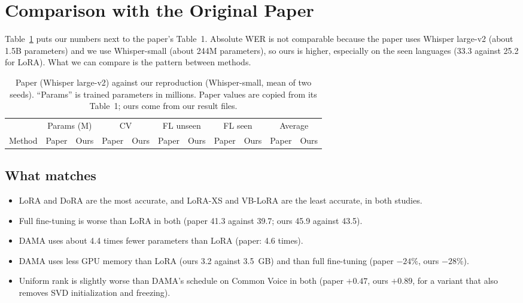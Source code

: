 \documentclass[11pt,a4paper]{article}
\begin{document}
\section{Comparison with the Original Paper}
Table~\ref{tab:paper} puts our numbers next to the paper's Table~1. Absolute WER is not comparable because the paper uses Whisper large-v2 (about 1.5B parameters) and we use Whisper-small (about 244M parameters), so ours is higher, especially on the seen languages (33.3 against 25.2 for LoRA). What we can compare is the pattern between methods.
\begin{table}[H]\centering\scriptsize\setlength{\tabcolsep}{3pt}
\begin{tabular}{lrrrrrrrrrr}\toprule
 & \multicolumn{2}{c}{Params (M)} & \multicolumn{2}{c}{CV} & \multicolumn{2}{c}{FL unseen} & \multicolumn{2}{c}{FL seen} & \multicolumn{2}{c}{Average}\\
\cmidrule(lr){2-3}\cmidrule(lr){4-5}\cmidrule(lr){6-7}\cmidrule(lr){8-9}\cmidrule(lr){10-11}
Method & Paper & Ours & Paper & Ours & Paper & Ours & Paper & Ours & Paper & Ours\\\midrule

\end{tabular}
\caption{Paper (Whisper large-v2) against our reproduction (Whisper-small, mean of two seeds). ``Params'' is trained parameters in millions. Paper values are copied from its Table~1; ours come from our result files.}\label{tab:paper}
\end{table}

\subsection{What matches}
\begin{itemize}
\item LoRA and DoRA are the most accurate, and LoRA-XS and VB-LoRA are the least accurate, in both studies.
\item Full fine-tuning is worse than LoRA in both (paper 41.3 against 39.7; ours 45.9 against 43.5).
\item DAMA uses about 4.4 times fewer parameters than LoRA (paper: 4.6 times).
\item DAMA uses less GPU memory than LoRA (ours 3.2 against 3.5~GB) and than full fine-tuning (paper $-24\%$, ours $-28\%$).
\item Uniform rank is slightly worse than DAMA's schedule on Common Voice in both (paper $+0.47$, ours $+0.89$, for a variant that also removes SVD initialization and freezing).
\end{itemize}
\end{document}
